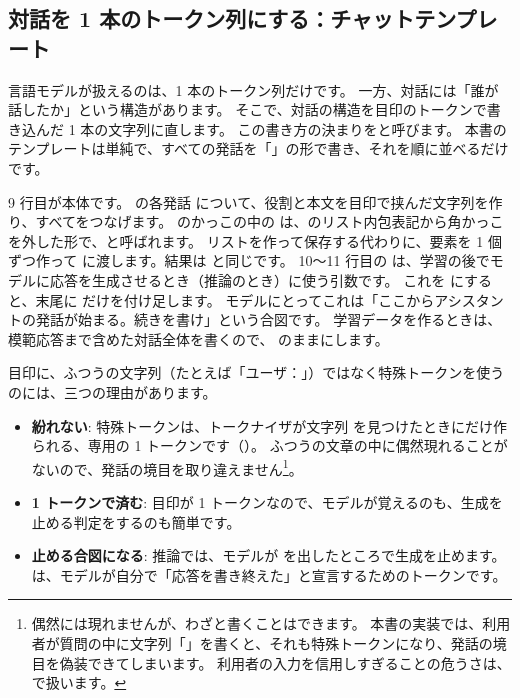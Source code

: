 \subsection{対話を 1 本のトークン列にする：チャットテンプレート}\label{sec:post-template}

言語モデルが扱えるのは、1 本のトークン列だけです。
一方、対話には「誰が話したか」という構造があります。
そこで、対話の構造を目印のトークンで書き込んだ 1 本の文字列に直します。
この書き方の決まりをと呼びます。
本書のテンプレートは単純で、すべての発話を「」の形で書き、それを順に並べるだけです。


9 行目が本体です。
 の各発話  について、役割と本文を目印で挟んだ文字列を作り、すべてをつなげます。
 のかっこの中の  は、のリスト内包表記から角かっこ \code{[ ]} を外した形で、と呼ばれます。
リストを作って保存する代わりに、要素を 1 個ずつ作って  に渡します。結果は  と同じです。
10〜11 行目の  は、学習の後でモデルに応答を生成させるとき（推論のとき）に使う引数です。
これを  にすると、末尾に  だけを付け足します。
モデルにとってこれは「ここからアシスタントの発話が始まる。続きを書け」という合図です。
学習データを作るときは、模範応答まで含めた対話全体を書くので、 のままにします。

目印に、ふつうの文字列（たとえば「ユーザ：」）ではなく特殊トークンを使うのには、三つの理由があります。

\begin{itemize}
\item \textbf{紛れない}: 特殊トークンは、トークナイザが文字列  を見つけたときにだけ作られる、専用の 1 トークンです（）。
ふつうの文章の中に偶然現れることがないので、発話の境目を取り違えません\footnote{偶然には現れませんが、わざと書くことはできます。
本書の実装では、利用者が質問の中に文字列「」を書くと、それも特殊トークンになり、発話の境目を偽装できてしまいます。
利用者の入力を信用しすぎることの危うさは、で扱います。}。
\item \textbf{1 トークンで済む}: 目印が 1 トークンなので、モデルが覚えるのも、生成を止める判定をするのも簡単です。
\item \textbf{止める合図になる}: 推論では、モデルが  を出したところで生成を止めます。
 は、モデルが自分で「応答を書き終えた」と宣言するためのトークンです。
\end{itemize}

